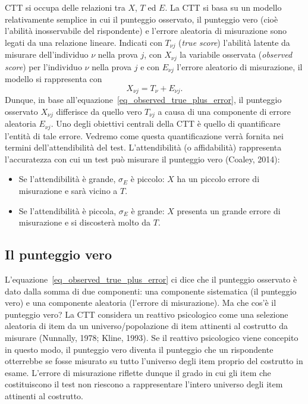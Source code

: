 CTT si occupa delle relazioni tra $X$, $T$ ed $E$.
La CTT si basa su un modello relativamente semplice in cui il punteggio osservato, il punteggio vero (cioè l'abilità inosservabile del rispondente) e l'errore aleatoria di misurazione sono legati da una relazione lineare. 
Indicati con $T_{\nu j}$ (\emph{true score}) l'abilità latente  da misurare dell'individuo $\nu$ nella prova $j$, con $X_{\nu j}$ la variabile osservata (\emph{observed score}) per l'individuo $\nu$ nella prova $j$ e con $E_{\nu j}$ l'errore aleatorio di misurazione, il modello si rappresenta con 
\begin{equation}
X_{\nu j} = T_{\nu} + E_{\nu j}. 
\label{eq_observed_true_plus_error}
\end{equation}
Dunque, in base all'equazione~\ref{eq_observed_true_plus_error}, il punteggio osservato $X_{\nu j}$ differisce da quello vero $T_{\nu j}$ a causa di una componente di errore aleatoria $E_{\nu j}$. 
Uno degli obiettivi centrali della CTT è quello di quantificare l'entità di tale errore. 
Vedremo come questa quantificazione verrà fornita nei termini dell'attendibilità del test.
L'attendibilità (o affidabilità) rappresenta l'accuratezza con cui un test può misurare il punteggio vero (Coaley, 2014):
\begin{itemize}
\item Se l'attendibilità è grande, $\sigma_E$ è piccolo: $X$ ha un piccolo errore di misurazione e sarà vicino a $T$.
\item  Se l'attendibilità è piccola, $\sigma_E$ è grande: $X$ presenta un grande errore di misurazione e si discosterà molto da $T$.
\end{itemize}


\subsection{Il punteggio vero}

L'equazione~\ref{eq_observed_true_plus_error} ci dice che il punteggio osservato è dato dalla somma di due componenti: una componente sistematica (il punteggio vero) e una componente aleatoria (l'errore di misurazione). Ma che cos'è il punteggio vero? La CTT considera un reattivo psicologico come una selezione aleatoria di item da un universo/popolazione di item attinenti al costrutto da misurare (Nunnally, 1978; Kline, 1993). Se il reattivo psicologico viene concepito in questo modo, il punteggio vero diventa il punteggio che un rispondente otterrebbe se fosse misurato su tutto l'universo degli item proprio del costrutto in esame. L'errore di misurazione riflette dunque il grado in cui gli item che costituiscono il test non riescono a rappresentare l'intero universo degli item attinenti al costrutto. 

